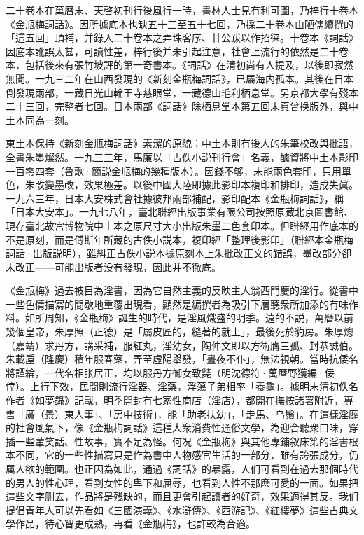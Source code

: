 二十卷本在萬曆末、天啓初刊行後風行一時，書林人士見有利可圖，乃梓行十卷本《金瓶梅詞話》。因所據底本也缺五十三至五十七回，乃採二十卷本由陋儒續撰的「這五回」頂補，并錄入二十卷本之弄珠客序、廿公跋以作招徕。十卷本《詞話》因底本訛誤太甚，可讀性差，梓行後并未引起注意，社會上流行的依然是二十卷本，包括後來有張竹坡評的第一奇書本。《詞話》在清初尚有人提及，以後即寂然無聞。一九三二年在山西發現的《新刻金瓶梅詞話》，已屬海内孤本。其後在日本倒發現兩部，一藏日光山輪王寺慈眼堂，一藏德山毛利栖息堂。另京都大學有殘本二十三回，完整者七回。日本兩部《詞話》除栖息堂本第五回末頁曾换版外，與中土本同為一刻。

東土本保持《新刻金瓶梅詞話》素潔的原貌；中土本則有後人的朱筆校改與批語，全書朱墨燦然。一九三三年，馬廉以「古佚小説刊行會」名義，醵資將中土本影印一百零四套{\innerzhushi（魯歌·簡説金瓶梅的幾種版本）}。因錢不够，未能兩色套印，只用單色，朱改變墨改，效果極差。以後中國大陸即據此影印本複印和排印，造成失眞。一九六三年，日本大安株式會社據彼邦兩部補配，影印配本《金瓶梅詞話》，稱「日本大安本」。一九七八年，臺北聨經出版事業有限公司按照原藏北京圖書館、現存臺北故宫博物院中土本之原尺寸大小出版朱墨二色套印本。但聨經用作底本的不是原刻，而是傅斯年所藏的古佚小説本，複印經「整理後影印」{\innerzhushi（聨經本金瓶梅詞話·出版説明）}，雖糾正古佚小説本據原刻本上朱批改正文的錯誤，墨改部分卻未改正——可能出版者没有發現，因此并不徹底。

《金瓶梅》過去被目為淫書，因為它自然主義的反映主人翁西門慶的淫行。從書中一些色情描寫的間歇地重覆出現看，顯然是編撰者為吸引下層聽衆所加添的有味作料。如所周知，《金瓶梅》誕生的時代，是淫風熾盛的明季。遠的不説，萬曆以前幾個皇帝，朱厚照（正德）是「屬皮匠的，縫著的就上」，最後死於豹房。朱厚熜（嘉靖）求丹方，講采補，服紅丸，淫幼女，陶仲文即以方術膺三孤、封恭誠伯。朱載垕（隆慶）積年服春藥，弄至虛陽舉發，「晝夜不仆」，無法視朝。當時抗倭名將譚綸，一代名相张居正，均以服丹方御女致斃{\innerzhushi（明沈德符·萬曆野獲編·佞倖）}。上行下效，民間則流行淫器、淫藥，浮蕩子弟相率「養龜」。據明末清初佚名作者《如夢錄》記載，明季開封有七家性商店（淫店），都開在撫按諸署附近，專售「廣（景）東人事」、「房中技術」，能「助老扶幼」，「走馬、乌鬚」。在這樣淫靡的社會風氣下，像《金瓶梅詞話》這種大衆消費性通俗文學，為迎合聽衆口味，穿插一些葷笑話、性故事，實不足為怪。何况《金瓶梅》與其他專鋪叙床笫的淫書根本不同，它的一些性描寫只是作為書中人物感官生活的一部分，雖有誇張成分，仍属人欲的範圍。也正因為如此，通過《詞話》的暴露，人们可看到在過去那個時代的男人的性心理，看到女性的卑下和屈辱，也看到人性不那麽可愛的一面。如果把這些文字删去，作品將是残缺的，而且更會引起讀者的好奇，效果適得其反。我们提倡青年人可以先看如《三國演義》、《水滸傳》、《西游記》、《紅樓夢》這些古典文學作品，待心智更成熟，再看《金瓶梅》，也許較為合適。

